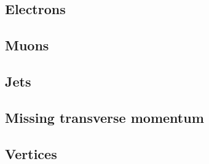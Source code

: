 
\subsection{Electrons}
\subsection{Muons}
\subsection{Jets}
\subsection{Missing transverse momentum}
\subsection{Vertices}
